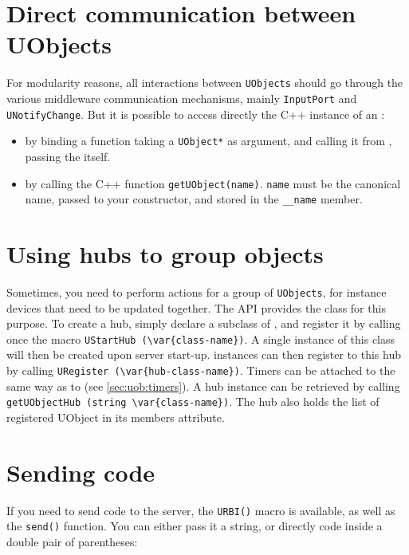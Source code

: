 \section{Direct communication between UObjects}

For modularity reasons, all interactions between \lstinline{UObjects} should
go through the various middleware communication mechanisms, mainly
\lstinline{InputPort} and \lstinline{UNotifyChange}. But it is possible to
access directly the C++ instance of an \UObject :

\begin{itemize}
\item by binding a function taking a \lstinline{UObject*} as argument, and
calling it from \us, passing the \UObject itself.
\item by calling the C++ function \lstinline{getUObject(name)}. \lstinline{name}
must be the canonical \UObject name, passed to your constructor, and stored in
the \lstinline{__name} member.
\end{itemize}


\section{Using hubs to group objects}

Sometimes, you need to perform actions for a group of \lstinline{UObjects},
for instance devices that need to be updated together. The API provides the
\UObjectHub class for this purpose. To create a hub, simply declare a
subclass of \UObjectHub, and register it by calling once the macro
\lstinline|UStartHub (\var{class-name})|. A single instance of this class
will then be created upon server start-up. \UObject instances can then
register to this hub by calling %
\lstinline|URegister (\var{hub-class-name})|. %
Timers can be attached to \UObjectHub the same way as to \UObject (see
\autoref{sec:uob:timers}). A hub instance can be retrieved by calling
\lstinline|getUObjectHub (string \var{class-name})|. The hub also holds the
list of registered UObject in its members attribute.

\section{Sending \us code}

If you need to send \us code to the server, the \lstinline{URBI()}
macro is available, as well as the \lstinline{send()} function. You
can either pass it a string, or directly \urbi code inside a double
pair of parentheses:

